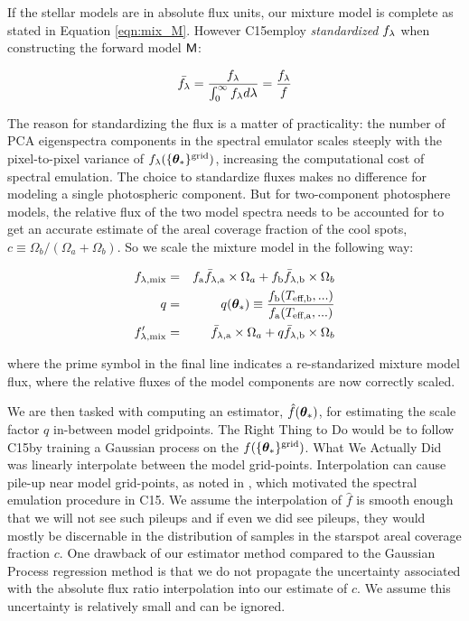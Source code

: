 \documentclass[twocolumn]{emulateapj}%
\newcommand{\iancze}{{\sc C15}}
\begin{document}
If the stellar models are in absolute flux units, our mixture model is complete as stated in Equation \ref{eqn:mix_M}.  However \iancze employ \emph{standardized} $f_\lambda$ when constructing the forward model $\mathsf{M}$:


\begin{eqnarray} \label{eqn:normalization}
\bar {f_\lambda} = \frac{f_\lambda}{\int_{0}^{\infty} f_\lambda d\lambda} = \frac{f_\lambda}{f}
\end{eqnarray}

The reason for standardizing the flux is a matter of practicality: the number of PCA eigenspectra components in the spectral emulator scales steeply with the pixel-to-pixel variance of $f_{\lambda}(\{{\bm \theta}_{\ast}\}^\textrm{grid})$, increasing the computational cost of spectral emulation.  The choice to standardize fluxes makes no difference for modeling a single photospheric component.  But for two-component photosphere models, the relative flux of the two model spectra needs to be accounted for to get an accurate estimate of the areal coverage fraction of the cool spots, $c \equiv \Omega_b/(\Omega_a+\Omega_b)$.  So we scale the mixture model in the following way:

\begin{eqnarray} \label{eqn:norm_scaling}
f_{\lambda, \mathrm{mix}} &=& f_{\mathrm{a}} \bar f_{\lambda, \mathrm{a}} \times \Omega_a + f_{\mathrm{b}} \bar f_{\lambda, \mathrm{b}} \times \Omega_b \\
q &=& q({\bm \theta}_{\ast})\equiv \frac{f_{\mathrm{b}}(T_\textrm{eff,b}, ...)}{f_{\mathrm{a}}(T_\textrm{eff,a}, ...)} \\
f_{\lambda, \mathrm{mix}}^{\prime} &=& \bar f_{\lambda, \mathrm{a}} \times \Omega_a + q \bar f_{\lambda, \mathrm{b}} \times \Omega_b
\end{eqnarray}

where the prime symbol in the final line indicates a re-standarized mixture model flux, where the relative fluxes of the model components are now correctly scaled.

We are then tasked with computing an estimator, $\hat f({\bm \theta}_{\ast})$, for estimating the scale factor $q$ in-between model gridpoints.  The Right Thing to Do would be to follow \iancze by training a Gaussian process on the $f(\{{\bm \theta}_{\ast}\}^\textrm{grid})$.  What We Actually Did was linearly interpolate between the model grid-points.  Interpolation can cause pile-up near model grid-points, as noted in \citet{cottaar14}, which motivated the spectral emulation procedure in \iancze.  We assume the interpolation of $\hat f$ is smooth enough that we will not see such pileups and if even we did see pileups, they would mostly be discernable in the distribution of samples in the starspot areal coverage fraction $c$.  One drawback of our estimator method compared to the Gaussian Process regression method is that we do not propagate the uncertainty associated with the absolute flux ratio interpolation into our estimate of $c$.  We assume this uncertainty is relatively small and can be ignored.
\end{document}

